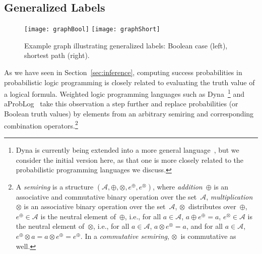 \documentclass[a4paper]{article}
\begin{document}
\subsection{Generalized Labels}\label{sec:dyna} 
\begin{figure}
\centering
\texttt{[image: graphBool]}\hspace{2cm}
\texttt{[image: graphShort]}
\caption{Example graph illustrating generalized labels: Boolean case (left),
  shortest path (right).}
\label{fig:dyna}
\end{figure} 
As we have seen in Section~\ref{sec:inference}, computing success probabilities in
probabilistic logic programming is closely related to evaluating the
truth value of a logical formula. Weighted logic programming languages such as
Dyna~\citep{Eisner05}\footnote{Dyna is currently being extended into a
  more general language~\citep{eisner-filardo-2011}, but we consider
  the initial version here, as that one is more closely related to
  the probabilistic programming languages we discuss. } and aProbLog~\citep{kimmig:aaai11} take this
observation a step further and replace probabilities (or Boolean
truth values) by elements from an arbitrary semiring and
corresponding combination operators.\footnote{A \emph{semiring} is a structure $(\mathcal{A}, \oplus, \otimes, 
e^{\oplus}, e^{\otimes})$, where \emph{addition}~$\oplus$ is an associative and commutative binary operation over
the set~$\mathcal{A}$, 
\emph{multiplication}~$\otimes$ is an associative binary operation over
the set~$\mathcal{A}$, 
$\otimes$~distributes
over~$\oplus$, 
$e^{\oplus}\in\mathcal{A}$ is the neutral element
of~$\oplus$, i.e., for all $a\in \mathcal{A}$, $a\oplus e^{\oplus}=a$,
$e^{\otimes}\in\mathcal{A}$ is the neutral element of~$\otimes$, i.e., for all $a\in \mathcal{A}$, $a\otimes e^{\otimes}=a$,
and
for all $a\in \mathcal{A}$, $e^{\oplus}\otimes a = a \otimes
e^{\oplus} = e^{\oplus}$.  In a \emph{commutative semiring}, $\otimes$~is
commutative as well.}
\end{document}
